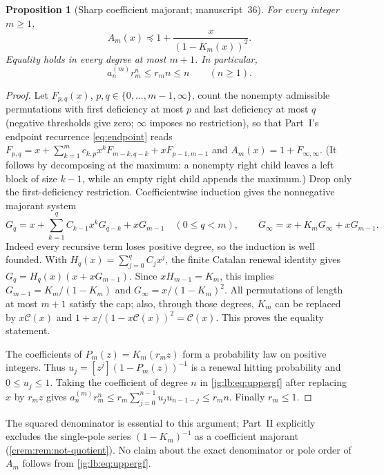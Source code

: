\documentclass[11pt,a4paper]{article}
\newtheorem{proposition}[proposition]{Proposition}
\theoremstyle{definition}\newaliascnt{definition}{theorem}
\theoremstyle{remark}\newaliascnt{remark}{theorem}
\newcommand{\Cat}{\mathcal C}
\newcommand{\preceqc}{\preceq}
\begin{document}
\begin{proposition}[Sharp coefficient majorant; manuscript~36]
\label{jg:lb:prop:upper}
For every integer $m\ge1$,
\begin{equation}\label{jg:lb:eq:uppergf}
 A_m(x)\preceqc 1+\frac{x}{(1-K_m(x))^2}.
\end{equation}
Equality holds in every degree at most $m+1$. In particular,
\begin{equation}\label{jg:lb:eq:uppercount}
 a_n^{(m)}r_m^n\le r_m n\le n\qquad(n\ge1).
\end{equation}
\end{proposition}
\begin{proof}
Let $F_{p,q}(x)$, $p,q\in\{0,\ldots,m-1,\infty\}$, count the nonempty
admissible permutations with first deficiency at most $p$ and last deficiency
at most $q$ (negative thresholds give zero; $\infty$ imposes no restriction),
so that Part~I's endpoint recurrence \eqref{eq:endpoint} reads
$F_{p,q}=x+\sum_{k=1}^mc_{k,p}x^kF_{m-k,q-k}+xF_{p-1,m-1}$ and
$A_m(x)=1+F_{\infty,\infty}$. (It follows by decomposing at the maximum: a
nonempty right child leaves a left block of size $k-1$, while an empty right
child appends the maximum.) Drop only the first-deficiency restriction.
Coefficientwise induction gives the nonnegative majorant system
\[
 G_q=x+\sum_{k=1}^{q}C_{k-1}x^kG_{q-k}+xG_{m-1}
 \quad(0\le q<m),\qquad
 G_\infty=x+K_mG_\infty+xG_{m-1}.
\]
Indeed every recursive term loses positive degree, so the induction is well
founded. With $H_q(x)=\sum_{j=0}^qC_jx^j$, the finite Catalan renewal identity
gives $G_q=H_q(x)(x+xG_{m-1})$. Since $xH_{m-1}=K_m$, this implies
$G_{m-1}=K_m/(1-K_m)$ and $G_\infty=x/(1-K_m)^2$. All permutations of length
at most $m+1$ satisfy the cap; also, through those degrees, $K_m$ can be
replaced by $x\Cat(x)$ and $1+x/(1-x\Cat(x))^2=\Cat(x)$. This proves the
equality statement.

The coefficients of $P_m(z)=K_m(r_mz)$ form a probability law on positive
integers. Thus $u_j=[z^j](1-P_m(z))^{-1}$ is a renewal hitting probability and
$0\le u_j\le1$. Taking the coefficient of degree $n$ in
\eqref{jg:lb:eq:uppergf} after replacing $x$ by $r_mz$ gives
$a_n^{(m)}r_m^n\le r_m\sum_{j=0}^{n-1}u_ju_{n-1-j}\le r_mn$. Finally
$r_m\le1$.
\end{proof}

The squared denominator is essential to this argument; Part~II explicitly
excludes the single-pole series $(1-K_m)^{-1}$ as a coefficient majorant
(\cref{crem:rem:not-quotient}). No claim about the exact denominator or pole
order of $A_m$ follows from \eqref{jg:lb:eq:uppergf}.
\end{document}
